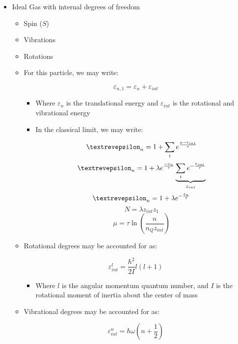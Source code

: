 \begin{itemize}
  \item Ideal Gas with internal degrees of freedom

    \begin{itemize}

      \item Spin ($S$)

      \item Vibrations

      \item Rotations

      \item For this particle, we may write:

        $$\varepsilon_{n,1}=\varepsilon_n+\varepsilon_{int}$$

        \begin{itemize}

          \item Where $\varepsilon_n$ is the translational energy and $\varepsilon_{int}$ is the rotational and vibrational energy

          \item In the classical limit, we may write:

            $$\text{\textrevepsilon}_n=1+\sum_i e^{\frac{\mu-\varepsilon_{int}}{\tau}}$$
            $$\text{\textrevepsilon}_n=1+\lambda e^{\frac{-\varepsilon_n}{\tau}}\underbrace{\sum_ie^{-\frac{\varepsilon_{int}}{\tau}}}_{z_{int}}$$
            $$\text{\textrevepsilon}_n=1+\lambda e^{-\frac{\varepsilon_n}{\tau}}$$
            $$N=\lambda z_{int}z_1$$
            $$\mu=\tau\ln\left( \frac{n}{n_Qz_{int}} \right)$$

        \end{itemize}

      \item Rotational degrees may be accounted for as:

        $$\varepsilon_{int}^l=\frac{\hbar^2}{2I}l(l+1)$$

        \begin{itemize}

          \item Where $l$ is the angular momentum quantum number, and $I$ is the rotational moment of inertia about the center of mass

        \end{itemize}

      \item Vibrational degrees may be accounted for as:

        $$\varepsilon_{int}^n=\hbar\omega\left( n+\frac{1}{2} \right)$$


\end{itemize}
\end{itemize}
